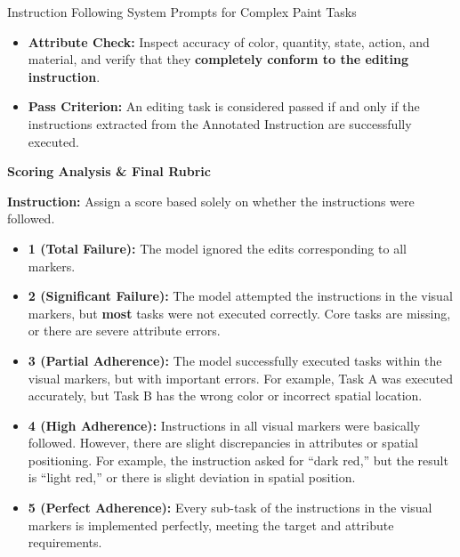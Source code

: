 \documentclass{llmxive}
\begin{document}
\begin{promptbox}[label={System Prompts: IF_Complex Paint}]{Instruction Following System Prompts for Complex Paint Tasks}
\begin{itemize}[leftmargin=2.2em, labelsep=0.4em, itemsep=2pt]
    \item \textbf{Attribute Check:} Inspect accuracy of color, quantity, state, action, and material, and verify that they \textbf{completely conform to the editing instruction}.
    
    \item \textbf{Pass Criterion:} An editing task is considered passed if and only if the instructions extracted from the Annotated Instruction are successfully executed.
\end{itemize}

\medskip

\textbf{Scoring Analysis \& Final Rubric}

\textbf{Instruction:} Assign a score based solely on whether the instructions were followed.

\begin{itemize}[leftmargin=2.2em, labelsep=0.4em, itemsep=2pt]
    \item \textbf{1 (Total Failure):} The model ignored the edits corresponding to all markers.
    
    \item \textbf{2 (Significant Failure):} The model attempted the instructions in the visual markers, but \textbf{most} tasks were not executed correctly. Core tasks are missing, or there are severe attribute errors.
    
    \item \textbf{3 (Partial Adherence):} The model successfully executed tasks within the visual markers, but with important errors. For example, Task A was executed accurately, but Task B has the wrong color or incorrect spatial location.
    
    \item \textbf{4 (High Adherence):} Instructions in all visual markers were basically followed. However, there are slight discrepancies in attributes or spatial positioning. For example, the instruction asked for ``dark red,'' but the result is ``light red,'' or there is slight deviation in spatial position.
    
    \item \textbf{5 (Perfect Adherence):} Every sub-task of the instructions in the visual markers is implemented perfectly, meeting the target and attribute requirements.
\end{itemize}

\end{promptbox}
\end{document}
